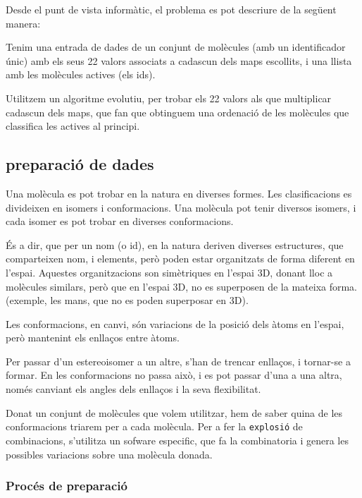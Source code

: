 \documentclass[titlepage,a4paper,12pt]{book}
\begin{document}
Desde el punt de vista informàtic, el problema es pot descriure de la següent
manera:

Tenim una entrada de dades de un conjunt de molècules (amb un identificador
únic) amb els seus 22 valors associats a cadascun dels maps escollits, i una
llista amb les molècules actives (els ids).

Utilitzem un algoritme evolutiu, per trobar els 22 valors als que multiplicar
cadascun dels maps, que fan que obtinguem una ordenació de les molècules que
classifica les actives al principi.

\subsection{preparació de dades} %
\label{sub:preparacio de dades}
Una molècula es pot trobar en la natura en diverses formes.  Les clasificacions es divideixen en
isomers i conformacions.  Una molècula pot tenir diversos isomers, i cada isomer es pot trobar en  
diverses conformacions.

És a dir, que per un nom (o id), en la natura deriven diverses estructures, que comparteixen nom, i
elements, però poden estar organitzats de forma diferent en l'espai. Aquestes organitzacions son
simètriques en l'espai 3D, donant lloc a molècules similars, però que en l'espai 3D, no es superposen de la
mateixa forma. (exemple, les mans, que no es poden superposar en 3D).

Les conformacions, en canvi, són variacions de la posició dels àtoms en l'espai, però mantenint els
enllaços entre àtoms.

Per passar d'un estereoisomer a un altre, s'han de trencar enllaços, i tornar-se a formar.  En les
conformacions no passa això, i es pot passar d'una a una altra, només canviant els angles dels
enllaços i la seva flexibilitat. 

Donat un conjunt de molècules que volem utilitzar, hem de saber quina de les conformacions triarem
per a cada molècula.  Per a fer la \texttt{explosió} de combinacions, s'utilitza un sofware
especific, que fa la combinatoria i genera les possibles variacions sobre una molècula donada. 

\subsubsection{Procés de preparació} %
\label{ssub:Proces de preparacio}
\end{document}
